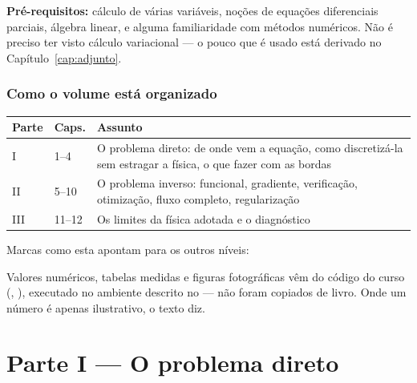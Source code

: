\documentclass[11pt,a4paper,oneside]{report}
\begin{document}
\textbf{Pr\'e-requisitos:} c\'alculo de v\'arias vari\'aveis, no\c{c}\~oes de
equa\c{c}\~oes diferenciais parciais, \'algebra linear, e alguma
familiaridade com m\'etodos num\'ericos. N\~ao \'e preciso ter visto
c\'alculo variacional --- o pouco que \'e usado est\'a derivado no
Cap\'itulo~\ref{cap:adjunto}.

\section*{Como o volume est\'a organizado}

\begin{center}
\begin{tabular}{@{}llp{7.9cm}@{}}
\toprule
\textbf{Parte} & \textbf{Caps.} & \textbf{Assunto} \\
\midrule
I   & 1--4   & O problema direto: de onde vem a equa\c{c}\~ao, como
discretiz\'a-la sem estragar a f\'isica, o que fazer com as bordas \\
II  & 5--10  & O problema inverso: funcional, gradiente, verifica\c{c}\~ao,
otimiza\c{c}\~ao, fluxo completo, regulariza\c{c}\~ao \\
III & 11--12 & Os limites da f\'isica adotada e o diagn\'ostico \\
\bottomrule
\end{tabular}
\end{center}

Marcas como esta apontam para os outros n\'iveis:


\begin{atencao}
Valores num\'ericos, tabelas medidas e figuras fotogr\'aficas v\^em do
c\'odigo do curso (, ), executado no ambiente
descrito no  --- n\~ao foram copiados de livro. Onde um
n\'umero \'e apenas ilustrativo, o texto diz.
\end{atencao}

\part*{\centering\color{azulfwi} Parte I --- O problema direto}
\end{document}
